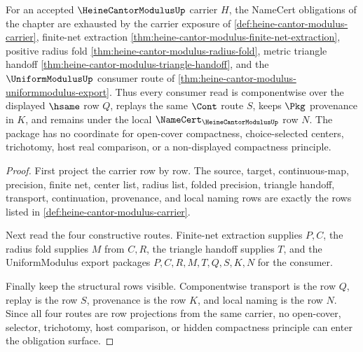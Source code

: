 \begin{theorem}
\label{thm:heine-cantor-modulus-obligation-closure}
For an accepted $\HeineCantorModulusUp$ carrier $H$, the NameCert obligations
of the chapter are exhausted by the carrier exposure of
\autoref{def:heine-cantor-modulus-carrier}, finite-net extraction
\autoref{thm:heine-cantor-modulus-finite-net-extraction}, positive radius
fold \autoref{thm:heine-cantor-modulus-radius-fold}, metric triangle handoff
\autoref{thm:heine-cantor-modulus-triangle-handoff}, and the
$\UniformModulusUp$ consumer route of
\autoref{thm:heine-cantor-modulus-uniformmodulus-export}. Thus every consumer
read is componentwise over the displayed $\hsame$ row $Q$, replays the same
$\Cont$ route $S$, keeps $\Pkg$ provenance in $K$, and remains under the local
$\NameCert_{\HeineCantorModulusUp}$ row $N$. The package has no coordinate for
open-cover compactness, choice-selected centers, trichotomy, host real
comparison, or a non-displayed compactness principle.
\end{theorem}
\begin{proof}
First project the carrier row by row. The source, target, continuous-map,
precision, finite net, center list, radius list, folded precision, triangle
handoff, transport, continuation, provenance, and local naming rows are exactly
the rows listed in \autoref{def:heine-cantor-modulus-carrier}.

Next read the four constructive routes. Finite-net extraction supplies $P,C$,
the radius fold supplies $M$ from $C,R$, the triangle handoff supplies $T$, and
the UniformModulus export packages $P,C,R,M,T,Q,S,K,N$ for the consumer.

Finally keep the structural rows visible. Componentwise transport is the row
$Q$, replay is the row $S$, provenance is the row $K$, and local naming is the
row $N$. Since all four routes are row projections from the same carrier, no
open-cover, selector, trichotomy, host comparison, or hidden compactness
principle can enter the obligation surface.
\end{proof}

